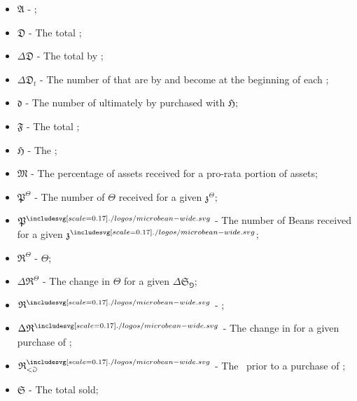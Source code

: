 \documentclass[class=article, crop=false]{standalone}
\begin{document}
\begin{itemize}[topsep=0pt, itemsep=3pt,leftmargin=16pt]
    \item[] $\mathfrak{A}$ - \hypertarget{ht12}{};
    \item[] $\mathfrak{D}$ - \hypertarget{ht41}{The total };
    \item[] $\Delta \mathfrak{D}$ - \hypertarget{ht54}{The total   by };
    \item[] $\Delta \mathfrak{D}_t$ - \hypertarget{ht55}{The number of  that are  by  and become  at the beginning of each };
    \item[] $\mathfrak{d}$ - \hypertarget{ht42}{The number of  ultimately  by  purchased with  $\mathfrak{H}$};
    \item[] $\mathfrak{F}$ - \hypertarget{ht85}{The total };
    \item[] $\mathfrak{H}$ - \hypertarget{ht111}{The };
    \item[] $\mathfrak{M}$ - \hypertarget{ht129}{The percentage of  assets received for  a pro-rata portion of  assets};
    \item[] $\mathfrak{P}^{\Theta}$ - \hypertarget{ht143}{The number of $\Theta$ received for  a given $\mathfrak{z}^{\Theta}$};
    \item[] $\mathfrak{P}^{\bean}$ - \hypertarget{ht142}{The number of Beans received for  a given $\mathfrak{z}^{\bean}$};
    \item[] $\mathfrak{R}^{\Theta}$ - \hypertarget{ht160}{ $\Theta$};
    \item[] $\Delta \mathfrak{R}^{\Theta}$ - \hypertarget{ht59}{The change in  $\Theta$ for a given $\Delta \mathfrak{S}_{\Game}$};
    \item[] $\mathfrak{R}^{\bean}$ - \hypertarget{ht158}{ \Bean};
    \item[] $\Delta \mathfrak{R}^{\bean}$ - \hypertarget{ht58}{The change in  \Bean for a given purchase of };
    \item[] $\mathfrak{R}_{<\Game}^{\bean}$ - \hypertarget{ht159}{The  \Bean\ prior to a purchase of };
    \item[] $\mathfrak{S}$ - \hypertarget{ht174}{The total  sold};

\end{itemize}
\end{document}
